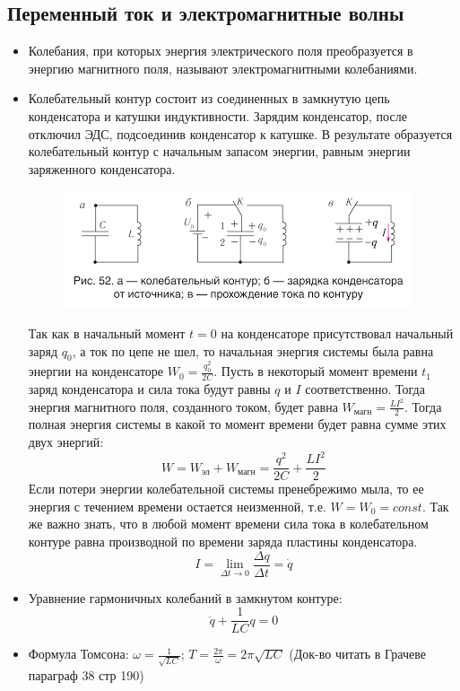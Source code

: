 \documentclass{article}
\begin{document}
\begin{flushleft}
    \section{Переменный ток и электромагнитные волны}
    \begin{itemize}
        \item Колебания, при которых энергия электрического поля преобразуется в энергию магнитного поля, называют электромагнитными колебаниями.
        \item Колебательный контур состоит из соединенных в замкнутую цепь конденсатора и катушки индуктивности. Зарядим конденсатор, после отключил ЭДС, подсоединив конденсатор к катушке. В результате образуется колебательный контур с начальным запасом энергии, равным  энергии заряженного конденсатора.
        \begin{figure}[h]
            \centering
            \includegraphics[width=0.5\linewidth]{images/Kontur.png}
            \label{fig:enter-label}
        \end{figure}
        Так как в начальный момент $t = 0$ на конденсаторе присутствовал начальный заряд $q_0$, а ток по цепе не шел, то начальная энергия системы была равна энергии на конденсаторе $W_0 = \frac{q_0^2}{2C}$. Пусть в некоторый момент времени $t_1$ заряд конденсатора и сила тока будут равны $q$ и $I$ соответственно. Тогда энергия магнитного поля, созданного током, будет равна $W_\text{магн} = \frac{LI^2}{2}$. Тогда полная энергия системы в какой то момент времени будет равна сумме этих двух энергий: \[W = W_\text{эл} + W_\text{магн} = \frac{q^2}{2C} + \frac{LI^2}{2}\]
        Если потери энергии колебательной системы пренебрежимо мыла, то ее энергия с течением времени остается неизменной, т.е. $W = W_0 = const$.
        Так же важно знать, что в любой момент времени сила тока в колебательном контуре равна производной по времени заряда пластины конденсатора. \[I = \lim\limits_{\Delta t\to 0} \frac{\Delta q}{\Delta t} = \dot q\]
        \item Уравнение гармоничных колебаний в замкнутом контуре: \[\ddot q + \frac{1}{LC}q = 0\]
        \item Формула Томсона: $\omega = \frac{1}{\sqrt{LC}}$; $T = \frac{2\pi}{\omega} = 2\pi \sqrt{LC}$ (Док-во читать в Грачеве параграф 38 стр 190)

\end{itemize}
\end{flushleft}
\end{document}

